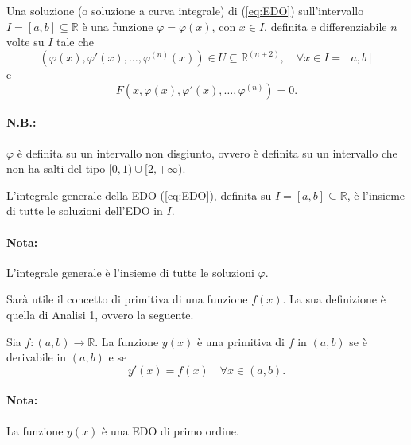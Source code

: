 \begin{definition}\label{def:curva_integrale_EDO}
    Una soluzione (o soluzione a curva integrale) di (\ref{eq:EDO}) sull'intervallo $I=[a,b]\subseteq\mathbb R$ è una funzione $\varphi=\varphi(x)$, con $x\in I$, definita e differenziabile $n$ volte su $I$ tale che
    \begin{equation*}
        (\varphi(x),\varphi'(x),\hdots,\varphi^{(n)}(x))\in U\subseteq\mathbb R^{(n+2)},\quad \forall x\in I=[a,b]
    \end{equation*}
    e
    \begin{equation*}
        F(x,\varphi(x),\varphi'(x),\hdots,\varphi^{(n)})=0.
    \end{equation*}
\end{definition}

\paragraph{N.B.:} $\varphi$ è definita su un intervallo non disgiunto, ovvero è definita su un intervallo che non ha salti del tipo $[0,1)\cup[2, +\infty)$.

\begin{definition}\label{def:integrale_generale_EDO}
    L'integrale generale della EDO (\ref{eq:EDO}), definita su $I=[a,b]\subseteq \mathbb R$, è l'insieme di tutte le soluzioni dell'EDO in $I$.
\end{definition}

\paragraph{Nota:} L'integrale generale è l'insieme di tutte le soluzioni $\varphi$.

Sarà utile il concetto di primitiva di una funzione $f(x)$. La sua definizione è quella di Analisi 1, ovvero la seguente.

\begin{definition}[Primitiva]
    Sia $f\colon (a,b)\rightarrow\mathbb R$. La funzione $y(x)$ è una primitiva di $f$ in $(a,b)$ se è derivabile in $(a,b)$ e se
    \begin{equation*}
        y'(x)=f(x)\quad\forall x\in(a,b).
    \end{equation*}
\end{definition}

\paragraph{Nota:} La funzione $y(x)$ è una EDO di primo ordine.

